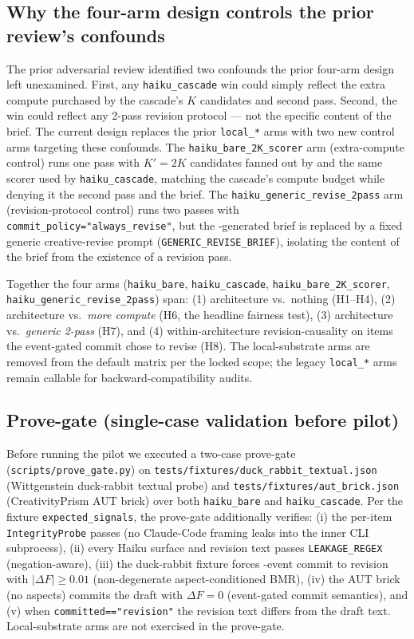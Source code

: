 \subsection{Why the four-arm design controls the prior review's confounds}\label{sec:bench-fairness}

The prior adversarial review identified two confounds the prior four-arm design left unexamined. First, any \texttt{haiku\_cascade} win could simply reflect the extra compute purchased by the cascade's $K$ candidates and second pass. Second, the win could reflect any 2-pass revision protocol --- not the specific content of the  brief. The current design replaces the prior \texttt{local\_*} arms with two new control arms targeting these confounds. The \texttt{haiku\_bare\_2K\_scorer} arm (extra-compute control) runs one pass with $K'=2K$ candidates fanned out by  and the same  scorer used by \texttt{haiku\_cascade}, matching the cascade's compute budget while denying it the second pass and the  brief. The \texttt{haiku\_generic\_revise\_2pass} arm (revision-protocol control) runs two passes with \texttt{commit\_policy="always\_revise"}, but the -generated brief is replaced by a fixed generic creative-revise prompt (\texttt{GENERIC\_REVISE\_BRIEF}), isolating the content of the brief from the existence of a revision pass.

Together the four arms (\texttt{haiku\_bare}, \texttt{haiku\_cascade}, \texttt{haiku\_bare\_2K\_scorer}, \texttt{haiku\_generic\_revise\_2pass}) span: (1) architecture vs.\ nothing (H1--H4), (2) architecture vs.\ \emph{more compute} (H6, the headline fairness test), (3) architecture vs.\ \emph{generic 2-pass} (H7), and (4) within-architecture revision-causality on items the event-gated commit chose to revise (H8). The local-substrate arms are removed from the default matrix per the locked scope; the legacy \texttt{local\_*} arms remain callable for backward-compatibility audits.

\subsection{Prove-gate (single-case validation before pilot)}

Before running the pilot we executed a two-case prove-gate (\texttt{scripts/prove\_gate.py}) on \nolinkurl{tests/fixtures/duck_rabbit_textual.json} (Wittgenstein duck-rabbit textual probe) and \nolinkurl{tests/fixtures/aut_brick.json} (CreativityPrism AUT brick) over both \texttt{haiku\_bare} and \texttt{haiku\_cascade}. Per the fixture \texttt{expected\_signals}, the prove-gate additionally verifies: (i) the per-item \texttt{IntegrityProbe} passes (no Claude-Code framing leaks into the inner CLI subprocess), (ii) every Haiku surface and revision text passes \texttt{LEAKAGE\_REGEX} (negation-aware), (iii) the duck-rabbit fixture forces -event commit to revision with $|\Delta F| \geq 0.01$ (non-degenerate aspect-conditioned BMR), (iv) the AUT brick (no aspects) commits the draft with $\Delta F = 0$ (event-gated commit semantics), and (v) when \texttt{committed=="revision"} the revision text differs from the draft text. Local-substrate arms are not exercised in the prove-gate.
